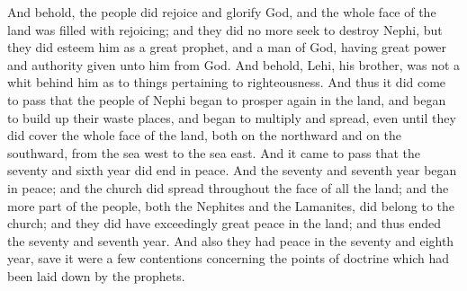 \bverse \iffalse And behold, the people did rejoice and glorify God, and the whole face of the land was filled with rejoicing; and they did no more seek to destroy Nephi, but they did esteem him as a great prophet, and a man of God, having great power and authority given unto him from God. \fi
And behold, the people did rejoice and glorify God, and the whole face of the land was filled with rejoicing; and they did no more seek to destroy Nephi, but they did esteem him as a great prophet, and a man of God, having great power and authority given unto him from God.
\bverse \iffalse And behold, Lehi, his brother, was not a whit behind him as to things pertaining to righteousness. \fi
And behold, Lehi, his brother, was not a whit behind him as to things pertaining to righteousness.
\bverse \iffalse And thus it did come to pass that the people of Nephi began to prosper again in the land, and began to build up their waste places, and began to multiply and spread, even until they did cover the whole face of the land, both on the northward and on the southward, from the sea west to the sea east. \fi
And thus it did come to pass that the people of Nephi began to prosper again in the land, and began to build up their waste places, and began to multiply and spread, even until they did cover the whole face of the land, both on the northward and on the southward, from the sea west to the sea east.
\bverse \iffalse And it came to pass that the seventy and sixth year did end in peace. And the seventy and seventh year began in peace; and the church did spread throughout the face of all the land; and the more part of the people, both the Nephites and the Lamanites, did belong to the church; and they did have exceedingly great peace in the land; and thus ended the seventy and seventh year. \fi
And it came to pass that the seventy and sixth year did end in peace. And the seventy and seventh year began in peace; and the church did spread throughout the face of all the land; and the more part of the people, both the Nephites and the Lamanites, did belong to the church; and they did have exceedingly great peace in the land; and thus ended the seventy and seventh year.
\bverse \iffalse And also they had peace in the seventy and eighth year, save it were a few contentions concerning the points of doctrine which had been laid down by the prophets. \fi
And also they had peace in the seventy and eighth year, save it were a few contentions concerning the points of doctrine which had been laid down by the prophets.

